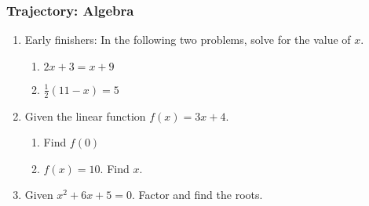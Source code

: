 

\fancyhead[LE]{\thepage}



\subsubsection*{Trajectory: Algebra}
\begin{enumerate}
\item Early finishers: In the following two problems, solve for the value of $x$.
  \begin{multicols}{2}
    \begin{enumerate}
      \item   $2x+3=x + 9$ \vspace{6cm}
      \item   $\frac{1}{2}(11-x)=5$ \vspace{6cm}
    \end{enumerate}
  \end{multicols}
  \vspace{5cm}

\item Given the linear function $f(x)=3x+4$.
\begin{multicols}{2}
  \begin{enumerate}
    \item Find $f(0)$ \vspace{6cm}
    \item   $f(x)=10$. Find $x$. \vspace{6cm}
  \end{enumerate}
\end{multicols}
  \vspace{6cm}

\item Given $x^2+6x+5=0$. Factor and find the roots. \vspace{4cm}

\end{enumerate}
